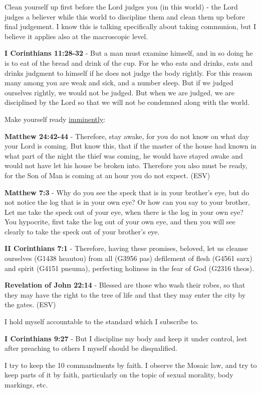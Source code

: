 \documentclass[11pt]{article}
\begin{document}
Clean yourself up first before the Lord judges you (in this world) - the Lord judges a believer while this world to discipline them and clean them up before final judgement.
I know this is talking specifically about taking communion, but I believe it applies also at the macroscopic level.

\textbf{I Corinthians 11:28-32} - But a man must examine himself, and in so doing he is to eat of the bread and drink of the cup.  For he who eats and drinks, eats and drinks judgment to himself if he does not judge the body rightly.  For this reason many among you are weak and sick, and a number sleep.  But if we judged ourselves rightly, we would not be judged.  But when we are judged, we are disciplined by the Lord so that we will not be condemned along with the world.

Make yourself ready \uline{imminently}:

\textbf{Matthew 24:42-44} - Therefore, stay awake, for you do not know on what day your Lord is coming. But know this, that if the master of the house had known in what part of the night the thief was coming, he would have stayed awake and would not have let his house be broken into. Therefore you also must be ready, for the Son of Man is coming at an hour you do not expect. (ESV)

\textbf{Matthew 7:3} - Why do you see the speck that is in your brother's eye, but do not notice the log that is in your own eye?  Or how can you say to your brother, Let me take the speck out of your eye, when there is the log in your own eye?  You hypocrite, first take the log out of your own eye, and then you will see clearly to take the speck out of your brother's eye.

\textbf{II Corinthians 7:1} - Therefore, having these promises, beloved, let us cleanse ourselves (G1438 heautou) from all (G3956 pas) defilement of flesh (G4561 sarx) and spirit (G4151 pneuma), perfecting holiness in the fear of God (G2316 theos).

\textbf{Revelation of John 22:14} - Blessed are those who wash their robes, so that they may have the right to the tree of life and that they may enter the city by the gates. (ESV)

I hold myself accountable to the standard which I subscribe to.

\textbf{I Corinthians 9:27} - But I discipline my body and keep it under control, lest after preaching to others I myself should be disqualified.

I try to keep the 10 commandments by faith.
I observe the Mosaic law, and try to keep parts of it by faith, particularly
on the topic of sexual morality, body markings, etc.
\end{document}
